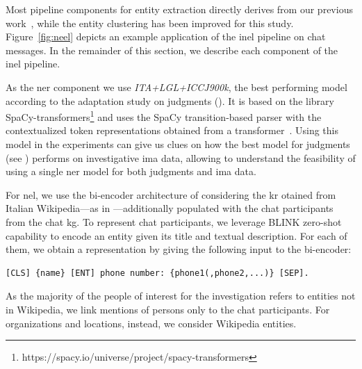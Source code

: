 Most pipeline components for entity extraction directly derives from our previous work~\cite{aixia_2023,BELLANDI2024,ijckg2022},
while the entity clustering has been improved for this study. 
Figure~\ref{fig:neel} depicts an example application of the \ac{inel} pipeline on chat messages.
In the remainder of this section, we describe each component of the \ac{inel} pipeline.

As the \ac{ner} component we use \emph{ITA+LGL+ICCJ900k}, the best performing model according to the adaptation study on judgments (). It is based on the library SpaCy-transformers\footnote{https://spacy.io/universe/project/spacy-transformers} and uses the SpaCy transition-based parser with the contextualized token representations obtained from a transformer~\cite{vaswani_transformers_2017}.
Using this model in the experiments can give us clues on how the best model for judgments (see ) performs on investigative \ac{ima} data, allowing to understand the feasibility of using a single \ac{ner} model for both judgments and \ac{ima} data.



For \ac{nel}, we use the bi-encoder architecture of \blinkita considering the \ac{kr} otained from Italian Wikipedia---as in ---additionally populated with the chat participants from the chat \ac{kg}.
To represent chat participants, we leverage BLINK zero-shot capability to encode an entity given its title and textual description. For each of them, we obtain a representation by giving the following input to the bi-encoder:
\begin{lstlisting}
[CLS] {name} [ENT] phone number: {phone1(,phone2,...)} [SEP].
\end{lstlisting}
As the majority of the people of interest for the investigation refers to entities not in Wikipedia, we link mentions of persons only to the chat participants. For organizations and locations, instead, we consider Wikipedia entities.

